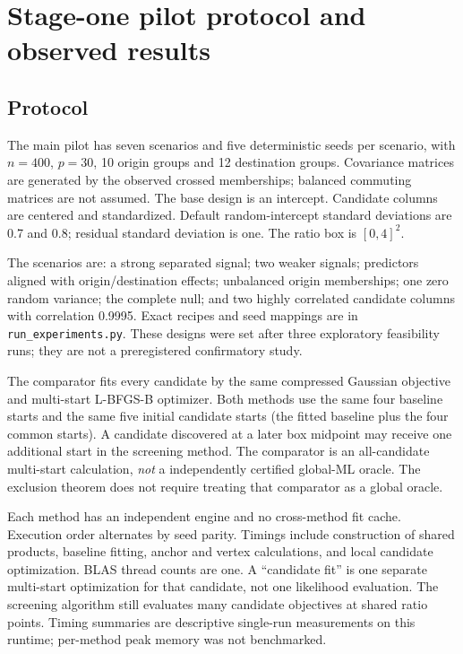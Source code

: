 \documentclass[11pt,a4paper]{article}
\theoremstyle{remark}\newtheorem{remark}[theorem]{Remark}
\begin{document}
\section{Stage-one pilot protocol and observed results}
\subsection{Protocol}
The main pilot has seven scenarios and five deterministic seeds per scenario,
with $n=400$, $p=30$, 10 origin groups and 12 destination groups. Covariance matrices
are generated by the observed crossed memberships; balanced commuting matrices
are not assumed. The base design is an intercept. Candidate columns are centered
and standardized. Default random-intercept standard deviations are 0.7 and 0.8;
residual standard deviation is one. The ratio box is $[0,4]^2$.

The scenarios are: a strong separated signal; two weaker signals; predictors
aligned with origin/destination effects; unbalanced origin memberships; one zero
random variance; the complete null; and two highly correlated candidate columns
with correlation 0.9995. Exact recipes and seed mappings are in
\texttt{run\_experiments.py}. These designs were set after three exploratory
feasibility runs; they are not a preregistered confirmatory study.

The comparator fits every candidate by the same compressed Gaussian objective
and multi-start L-BFGS-B optimizer. Both methods use the same four baseline starts
and the same five initial candidate starts (the fitted baseline plus the four
common starts). A candidate discovered at a later box midpoint may receive one
additional start in the screening method. The comparator is an all-candidate
multi-start calculation, \emph{not} a independently certified global-ML oracle.
The exclusion theorem does not require treating that comparator as a global oracle.

Each method has an independent engine and no cross-method fit cache. Execution
order alternates by seed parity. Timings include construction of shared products,
baseline fitting, anchor and vertex calculations, and local candidate optimization.
BLAS thread counts are one. A ``candidate fit'' is one separate multi-start
optimization for that candidate, not one likelihood evaluation. The screening
algorithm still evaluates many candidate objectives at shared ratio points.
Timing summaries are descriptive single-run measurements on this runtime;
per-method peak memory was not benchmarked.
\end{document}
